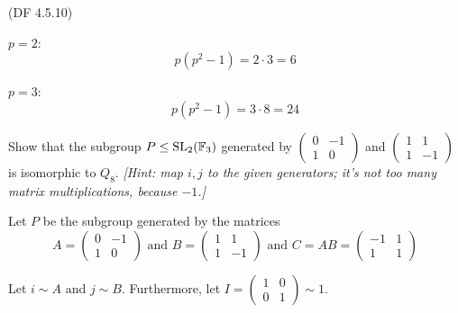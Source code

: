 \begin{problem}{(\textsf{DF 4.5.10})}
\begin{enumalph}
\begin{Answer}
        \begin{enumalph}
          \item $p = 2$:
            \[ p(p^2 - 1) = 2 \cdot 3 = 6\]
          \item $p = 3$:
            \[ p(p^2 - 1) = 3 \cdot 8 = 24\]
        \end{enumalph}
      \end{Answer}
    \item Show that the subgroup $P \leq \operatorname{SL}_2(\mathbb{F}_3)$ generated by
      $\begin{pmatrix} 0 & -1 \\ 1 & 0 \end{pmatrix}$
      and $\begin{pmatrix} 1 & 1 \\ 1 & -1 \end{pmatrix}$
      is isomorphic to $Q_8$.
      \emph{[Hint: map $i,j$ to the given generators; it's not too 
      many matrix multiplications, because $-1$.]}

      \begin{Answer}
        Let $P$ be the subgroup generated by the matrices
        \[ A = \begin{pmatrix} 0 & -1 \\ 1 & 0 \end{pmatrix} \text{ and }
          B = \begin{pmatrix} 1 & 1 \\ 1 & -1 \end{pmatrix} \text{ and }
          C = AB = \begin{pmatrix} -1 & 1 \\ 1 & 1 \end{pmatrix} \]
        
        \noindent
        Let $i \sim A$ and $j \sim B$. Furthermore, let
        $I = \begin{pmatrix} 1 & 0 \\ 0 & 1 \end{pmatrix} \sim 1$.


\end{Answer}
\end{enumalph}
\end{problem}
